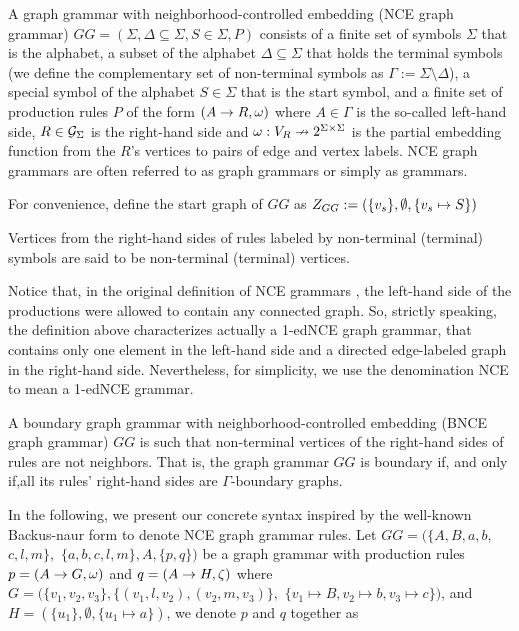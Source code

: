 \begin{definition}
	\label{def:gg}
	A graph grammar with neighborhood-controlled embedding (NCE graph grammar) $GG = (\Sigma, \Delta \subseteq \Sigma, S \in \Sigma, P)$ consists of a finite set of symbols $\Sigma$ that is the alphabet, a subset of the alphabet $\Delta \subseteq \Sigma$ that holds the terminal symbols (we define the complementary set of non-terminal symbols as $\Gamma := \Sigma \setminus \Delta$), a special symbol of the alphabet $S \in \Sigma$ that is the start symbol, and a finite set of production rules $P$ of the form $(A \to R, \omega)$ where $A \in \Gamma$ is the so-called left-hand side, $R \in \mathcal{G}_{\Sigma}$ is the right-hand side and $\omega : V_R \nrightarrow 2^{\Sigma \times \Sigma}$ is the partial embedding function from the $R$'s vertices to pairs of edge and vertex labels. NCE graph grammars are often referred to as graph grammars or simply as grammars.
	
	For convenience, define the start graph of $GG$ as $Z_{GG} := (\{v_s\},\emptyset,\{v_s \mapsto S\})$
	
	Vertices from the right-hand sides of rules labeled by non-terminal (terminal) symbols are said to be non-terminal (terminal) vertices.
\end{definition}

Notice that, in the original definition of NCE grammars \cite{janssens1982graph}, the left-hand side of the productions were allowed to contain any connected graph. So, strictly speaking, the definition above characterizes actually a 1-edNCE graph grammar, that contains only one element in the left-hand side and a directed edge-labeled graph in the right-hand side. Nevertheless, for simplicity, we use the denomination NCE to mean a 1-edNCE grammar.

\begin{definition}
	A boundary graph grammar with neighborhood-controlled embedding (BNCE graph grammar) $GG$ is such that non-terminal vertices of the right-hand sides of rules are not neighbors. That is, the graph grammar $GG$ is boundary if, and only if,all its rules' right-hand sides are $\Gamma\text{-boundary}$ graphs.
\end{definition}

In the following, we present our concrete syntax inspired by the well-known Backus-naur form to denote NCE graph grammar rules. Let $GG = (\{A, B, a, b,$ $ c, l, m\},$ $\{a, b, c, l, m\}, A, \{p,q\})$ be a graph grammar with production rules $p = (A \to G,\omega)$ and $q = (A \to H,\zeta)$ where $G = (\{v_1, v_2, v_3\}, \{(v_1,l,v_2), (v_2,m,v_3)\},$ $\{v_1 \mapsto B, v_2 \mapsto b, v_3 \mapsto c \})$, and $H = (\{u_1\}, \emptyset, \{u_1 \mapsto a\})$, we denote $p$ and $q$ together as\\


